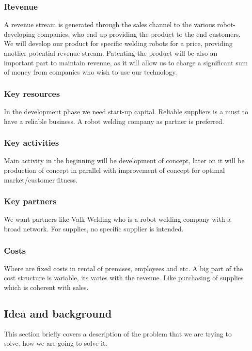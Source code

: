 \subsubsection{Revenue}
A revenue stream is generated through the sales channel to the various robot-developing companies, who end up providing the product to the end customers.
We will develop our product for specific welding robots for a price, providing another potential revenue stream. 
Patenting the product will be also an important part to maintain revenue, as it will allow us to charge a significant sum of money from companies who wish to use our technology.
\subsubsection{Key resources}
In the development phase we need start-up capital. Reliable suppliers is a must to have a reliable business. A robot welding company as partner is preferred. 
\subsubsection{Key activities}
Main activity in the beginning will be development of concept, later on it will be production of concept in parallel with improvement of concept for optimal market/customer fitness.
\subsubsection{Key partners}
We want partners like Valk Welding who is a robot welding company with a broad network. For supplies, no specific supplier is intended.
\subsubsection{Costs}
Where are fixed costs in rental of premises, employees and etc. A big part of the cost structure is variable, its varies with the revenue. Like purchasing of supplies which is coherent with sales. 




\subsection{Idea and background}
This section briefly covers a description of the problem that we are trying to solve, how we are going to solve it.

